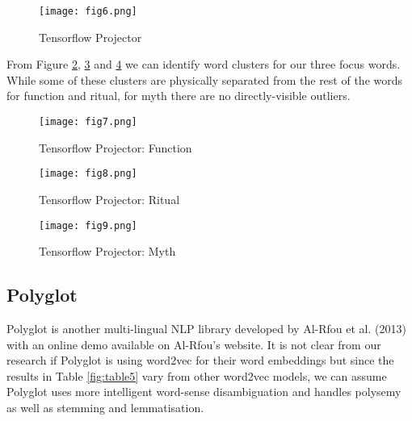 \documentclass[12pt, usenames, dvipsnames]{report}
\begin{document}
\begin{flushleft}
\vspace*{1.2em}
\begin{figure}[!htbp]
  \hspace*{-3.666em}
  \texttt{[image: fig6.png]}
  \caption{Tensorflow Projector}
  \label{fig:figure6}
\end{figure}
\vspace*{1.2em}

From Figure \ref{fig:figure7}, \ref{fig:figure8} and \ref{fig:figure9} we can identify word clusters for our three focus words.
While some of these clusters are physically separated from the rest of the words for function and ritual, for myth there are no directly-visible outliers.

\vspace*{1.2em}
\begin{figure}[!htbp]
  \hspace*{-3.666em}
  \texttt{[image: fig7.png]}
  \caption{Tensorflow Projector: Function}
  \label{fig:figure7}
\end{figure}
\vspace*{1.2em}

\vspace*{1.2em}
\begin{figure}[!htbp]
  \hspace*{-3.666em}
  \texttt{[image: fig8.png]}
  \caption{Tensorflow Projector: Ritual}
  \label{fig:figure8}
\end{figure}
\vspace*{1.2em}

\vspace*{1.2em}
\begin{figure}[!htbp]
  \hspace*{-3.666em}
  \texttt{[image: fig9.png]}
  \caption{Tensorflow Projector: Myth}
  \label{fig:figure9}
\end{figure}
\vspace*{1.2em}

\subsection{Polyglot}

Polyglot is another multi-lingual NLP library developed by Al-Rfou et al. (2013) \cite{alrfou2013} with an online demo available on Al-Rfou’s website.
It is not clear from our research if Polyglot is using word2vec for their word embeddings but since the results in Table \ref{fig:table5} vary from other word2vec models, we can assume Polyglot uses more intelligent word-sense disambiguation and handles polysemy as well as stemming and lemmatisation.


\end{flushleft}
\end{document}
